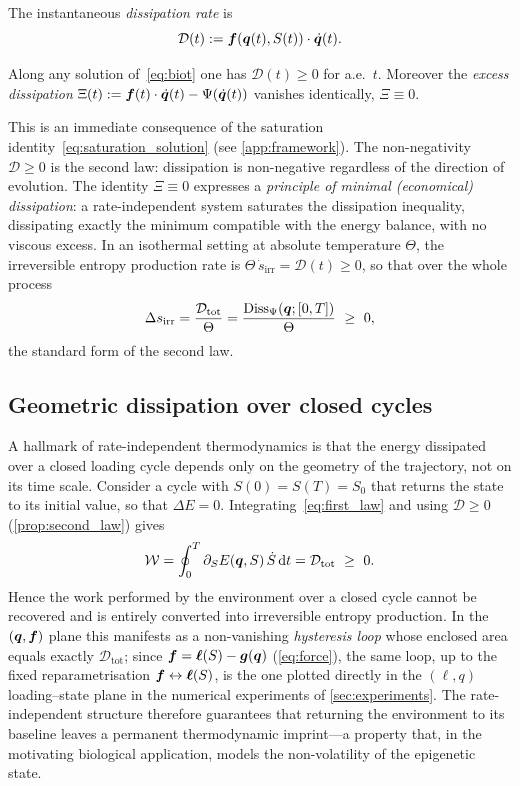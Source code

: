 The instantaneous \emph{dissipation rate} is
\begin{equation}\label{eq:diss_rate}
  \mathcal D(t) := \bm{f}(\bm{q}(t),S(t))\cdot\dot{\bm{q}}(t).
\end{equation}

\begin{proposition}\label{prop:second_law}
Along any solution of~\eqref{eq:biot} one has $\mathcal D(t)\ge 0$ for
a.e.\ $t$. Moreover the \emph{excess dissipation}
$\Xi(t):=\bm{f}(t)\cdot\dot{\bm{q}}(t)-\Psi(\dot{\bm{q}}(t))$ vanishes
identically, $\Xi\equiv 0$.
\end{proposition}

This is an immediate consequence of the saturation
identity~\eqref{eq:saturation_solution} (see \cref{app:framework}).
The non-negativity $\mathcal D\ge 0$ is the second law: dissipation is
non-negative regardless of the direction of evolution. The identity
$\Xi\equiv 0$ expresses a \emph{principle of minimal (economical)
dissipation}: a rate-independent system saturates the dissipation
inequality, dissipating exactly the minimum compatible with the energy
balance, with no viscous excess. In an isothermal setting at absolute
temperature $\Theta$, the irreversible entropy production rate is
$\Theta\,\dot s_{\mathrm{irr}}=\mathcal D(t)\ge0$, so that over the
whole process
\begin{equation}\label{eq:entropy}
  \Delta s_{\mathrm{irr}} = \frac{\mathcal D_{\mathrm{tot}}}{\Theta}
  = \frac{\mathrm{Diss}_\Psi(\bm{q};[0,T])}{\Theta}\ \ge\ 0,
\end{equation}
the standard form of the second law.

\subsection{Geometric dissipation over closed cycles}\label{sec:hysteresis}

A hallmark of rate-independent thermodynamics is that the energy
dissipated over a closed loading cycle depends only on the geometry of
the trajectory, not on its time scale. Consider a cycle with
$S(0)=S(T)=S_0$ that returns the state to its initial value, so that
$\Delta E=0$. Integrating~\eqref{eq:first_law} and using
$\mathcal D\ge0$ (\cref{prop:second_law}) gives
\begin{equation}\label{eq:cycle}
  \mathcal W = \oint_0^T \partial_S E(\bm{q},S)\,\dot S\mathop{}\!\mathrm{d} t
  = \mathcal D_{\mathrm{tot}} \ \ge\ 0.
\end{equation}
Hence the work performed by the environment over a closed cycle cannot
be recovered and is entirely converted into irreversible entropy
production. In the $(\bm{q},\bm{f})$ plane this manifests as a
non-vanishing \emph{hysteresis loop} whose enclosed area equals exactly
$\mathcal D_{\mathrm{tot}}$; since $\bm{f}=\bm{\ell}(S)-\bm{g}(\bm{q})$
(\cref{eq:force}), the same loop, up to the fixed reparametrisation
$\bm{f}\leftrightarrow\bm{\ell}(S)$, is the one plotted directly in the
$(\ell,q)$ loading--state plane in the numerical experiments of
\cref{sec:experiments}. The rate-independent structure therefore
guarantees that returning the environment to its baseline leaves a
permanent thermodynamic imprint---a property that, in the motivating
biological application, models the non-volatility of the epigenetic
state.
